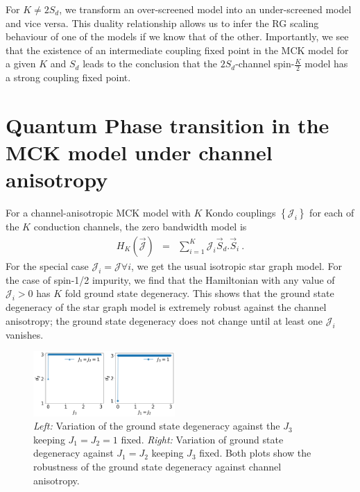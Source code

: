 \documentclass[reprint,prb,superscriptaddress]{revtex4-2}
\begin{document}
For \(K \neq 2S_d\), we transform an over-screened model into an under-screened model and vice versa. This duality relationship allows us to infer the RG scaling behaviour of one of the models if we know that of the other. Importantly, we see that the existence of an intermediate coupling fixed point in the MCK model for a given \(K\) and \(S_d\) leads to the conclusion that the \(2S_d\)-channel spin-\(\frac{K}{2}\) model has a strong coupling fixed point.

\section{Quantum Phase transition in the MCK model under channel anisotropy}
\label{anisotropic_rg}

For a channel-anisotropic MCK model with \(K\) Kondo couplings \(\left\{\mathcal{J}_i\right\}\) for each of the \(K\) conduction channels, the zero bandwidth model is 
\begin{eqnarray}
H_K (\vec{{\mathcal{J}}}) &=& \sum_{i=1}^{K} {\mathcal{J}}_i\vec{S}_d.\vec{S}_i~.
\label{eq:anisotropy}
\end{eqnarray}
For the special case $\mathcal{J}_i=\mathcal{J} \forall i$, we get the usual isotropic star graph model. For the case of spin-1/2 impurity, we find that the Hamiltonian with any value of $\mathcal{J}_i>0$ has $K$ fold ground state degeneracy. This shows that the ground state degeneracy of the star graph model is extremely robust against the channel anisotropy; the ground state degeneracy does not change until at least one \(\mathcal{J}_i\) vanishes.
\begin{figure}
\centering
\includegraphics[width=0.48\textwidth]{AnisotropyChannel3.png}
\caption{\textit{Left:} Variation of the ground state degeneracy against the $J_3$ keeping $J_1=J_2=1$ fixed. \textit{Right:} Variation of ground state degeneracy against $J_1=J_2$ keeping $J_3$ fixed. Both plots show the robustness of the ground state degeneracy against channel anisotropy.}
\label{fig:channel-anisotropy-}
\end{figure}
\end{document}
